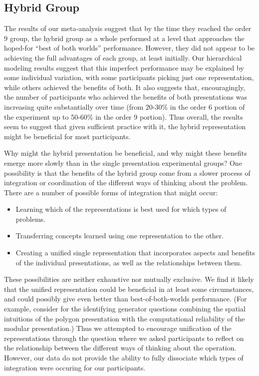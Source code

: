 \documentclass[man,mask,10pt]{apa6}
\begin{document}
\subsection{Hybrid Group}
The results of our meta-analysis suggest that by the time they reached the order 9 group, the hybrid group as a whole performed at a level that approaches the hoped-for ``best of both worlds'' performance. However, they did not appear to be achieving the full advantages of each group, at least initially. Our hierarchical modeling results suggest that this imperfect performance may be explained by some individual variation, with some participants picking just one representation, while others achieved the benefits of both. It also suggests that, encouragingly, the number of participants who achieved the benefits of both presentations was increasing quite substantially over time (from 20-30\% in the order 6 portion of the experiment up to 50-60\% in the order 9 portion). Thus overall, the results seem to suggest that given sufficient practice with it, the hybrid representation might be beneficial for most participants.\par 
Why might the hybrid presentation be beneficial, and why might these benefits emerge more slowly than in the single presentation experimental groups? One possibility is that the benefits of the hybrid group come from a slower process of integration or coordination \cite{Schwartz2015} of the different ways of thinking about the problem. There are a number of possible forms of integration that might occur:
\begin{itemize}
\item Learning which of the representations is best used for which types of problems. 
\item Transferring concepts learned using one representation to the other.
\item Creating a unified single representation that incorporates aspects and benefits of the individual presentations, as well as the relationships between them.  
\end{itemize} 
These possibilities are neither exhaustive nor mutually exclusive. We find it likely that the unified representation could be beneficial in at least some circumstances, and could possibly give even better than best-of-both-worlds performance. (For example, consider for the identifying generator questions combining the spatial intuitions of the polygon presentation with the computational reliability of the modular presentation.) Thus we attempted to encourage unification of the representations through the question where we asked participants to reflect on the relationship between the different ways of thinking about the operation. However, our data do not provide the ability to fully dissociate which types of integration were occuring for our participants. \par
\end{document}
